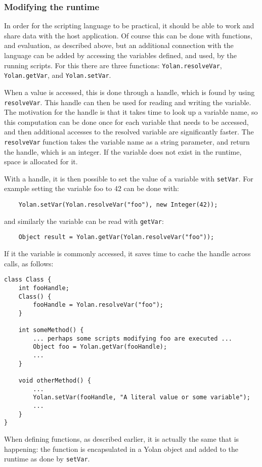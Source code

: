 \documentclass[11pt]{report}
\begin{document}
\subsubsection{Modifying the runtime}

In order for the scripting language to be practical, it should be able to work and share data with the host application. 
Of course this can be done with functions, and evaluation, as described above, but an additional connection with the language can be added by accessing the variables defined, and used, by the running scripts.
For this there are three functions: \verb|Yolan.resolveVar|, \verb|Yolan.getVar|, and \verb|Yolan.setVar|.

When a value is accessed, this is done through a handle, which is found by using \verb|resolveVar|. This handle can then be used for reading and writing the variable. The motivation for the handle is that it takes time to look up a variable name, so this computation can be done once for each variable that needs to be accessed, and then additional accesses to the resolved variable are significantly faster. The \verb|resolveVar| function takes the variable name as a string parameter, and return the handle, which is an integer. If the variable does not exist in the runtime, space is allocated for it.

With a handle, it is then possible to set the value of a variable with \verb|setVar|. For example setting the variable foo to 42 can be done with:
\begin{lstlisting}
    Yolan.setVar(Yolan.resolveVar("foo"), new Integer(42));
\end{lstlisting} 
and similarly the variable can be read with \verb|getVar|:
\begin{lstlisting}
    Object result = Yolan.getVar(Yolan.resolveVar("foo"));
\end{lstlisting}

If it the variable is commonly accessed, it saves time to cache the handle across calls, as follows:
\begin{lstlisting}
class Class {
    int fooHandle;
    Class() {
        fooHandle = Yolan.resolveVar("foo");
    }

    int someMethod() {
        ... perhaps some scripts modifying foo are executed ...
        Object foo = Yolan.getVar(fooHandle);
        ...
    }

    void otherMethod() {
        ... 
        Yolan.setVar(fooHandle, "A literal value or some variable");
        ...
    }
}
\end{lstlisting}
When defining functions, as described earlier, it is actually the same that is happening: the function is encapsulated in a Yolan object and added to the runtime as done by \verb|setVar|.
\end{document}
